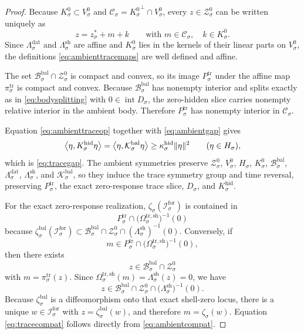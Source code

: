 \documentclass[11pt]{article}
\newcommand{\ForSpace}[1]{\mathcal I_{#1}^{\mathrm{for}}}
\newcommand{\BalBody}[1]{\mathcal B_{#1}^{\mathrm{bal}}}
\newcommand{\BalData}[1]{\Lambda_{#1}^{\mathrm{dat}}}
\newcommand{\BalShell}[1]{\Lambda_{#1}^{\mathrm{sh}}}
\newcommand{\ZeroHiddenSlice}[1]{\mathcal Z_{#1}^{0}}
\newcommand{\ZeroHiddenVec}[1]{V_{#1}^{0}}
\newcommand{\Kernel}[1]{K_{#1}^{0}}
\newcommand{\BalOp}[1]{\mathcal K_{#1}^{\mathrm{bal}}}
\newcommand{\BalEmbed}[1]{\zeta_{#1}^{\mathrm{bal}}}
\newcommand{\ReferencePoint}[1]{z_{#1}^{\ast}}
\newcommand{\GapSpace}[1]{H_{#1}}
\newcommand{\GapBody}[1]{D_{#1}}
\newcommand{\HiddenOperator}[1]{K_{#1}^{\mathrm{hid}}}
\newcommand{\CoreState}[1]{\mathcal C_{#1}}
\newcommand{\TraceBody}[1]{P_{#1}^{\mathrm{tr}}}
\newcommand{\TraceCoord}[1]{\pi_{#1}^{\mathrm{tr}}}
\newcommand{\TraceShellMap}[1]{\Omega_{#1}^{\mathrm{tr,sh}}}
\newcommand{\TraceEmbed}[1]{\zeta_{#1}}
\begin{document}
\begin{proof}
Because \(\Kernel{\sigma}\subset\ZeroHiddenVec{\sigma}\) and \(\CoreState{\sigma}={\Kernel{\sigma}}^{\perp}\cap\ZeroHiddenVec{\sigma}\), every \(z\in\ZeroHiddenSlice{\sigma}\) can be written uniquely as
\[
z=\ReferencePoint{\sigma}+m+k
\qquad
\text{with }
m\in\CoreState{\sigma},
\quad
k\in\Kernel{\sigma}.
\]
Since \(\BalData{\sigma}\) and \(\BalShell{\sigma}\) are affine and \(\Kernel{\sigma}\) lies in the kernels of their linear parts on \(\ZeroHiddenVec{\sigma}\), the definitions \eqref{eq:ambienttracemaps} are well defined and affine.

The set \(\BalBody{\sigma}\cap\ZeroHiddenSlice{\sigma}\) is compact and convex, so its image \(\TraceBody{\sigma}\) under the affine map \(\TraceCoord{\sigma}\) is compact and convex. Because \(\BalBody{\sigma}\) has nonempty interior and splits exactly as in \eqref{eq:bodysplitting} with \(0\in\operatorname{int}\GapBody{\sigma}\), the zero-hidden slice carries nonempty relative interior in the ambient body. Therefore \(\TraceBody{\sigma}\) has nonempty interior in \(\CoreState{\sigma}\).

Equation \eqref{eq:ambienttraceop} together with \eqref{eq:ambientgap} gives
\[
\ev{\eta,\HiddenOperator{\sigma}\eta}
=
\ev{\eta,\BalOp{\sigma}\eta}
\ge
\kappa_{\sigma}^{\mathrm{hid}}\|\eta\|^{2}
\qquad
(\eta\in\GapSpace{\sigma}),
\]
which is \eqref{eq:tracegap}. The ambient symmetries preserve \(\ZeroHiddenSlice{\sigma}\), \(\ZeroHiddenVec{\sigma}\), \(\GapSpace{\sigma}\), \(\Kernel{\sigma}\), \(\BalBody{\sigma}\), \(\BalData{\sigma}\), \(\BalShell{\sigma}\), and \(\BalOp{\sigma}\), so they induce the trace symmetry group and time reversal, preserving \(\TraceBody{\sigma}\), the exact zero-response trace slice, \(\GapBody{\sigma}\), and \(\HiddenOperator{\sigma}\).

For the exact zero-response realization, \(\TraceEmbed{\sigma}(\ForSpace{\sigma})\) is contained in
\[
\TraceBody{\sigma}\cap
\bigl(\TraceShellMap{\sigma}\bigr)^{-1}(0)
\]
because \(\BalEmbed{\sigma}(\ForSpace{\sigma})\subset
\BalBody{\sigma}\cap\ZeroHiddenSlice{\sigma}\cap(\BalShell{\sigma})^{-1}(0)\). Conversely, if
\[
m\in\TraceBody{\sigma}\cap
\bigl(\TraceShellMap{\sigma}\bigr)^{-1}(0),
\]
then there exists
\[
z\in\BalBody{\sigma}\cap\ZeroHiddenSlice{\sigma}
\]
with \(m=\TraceCoord{\sigma}(z)\). Since \(\TraceShellMap{\sigma}(m)=\BalShell{\sigma}(z)=0\), we have
\[
z\in
\BalBody{\sigma}\cap
\ZeroHiddenSlice{\sigma}\cap
\bigl(\BalShell{\sigma}\bigr)^{-1}(0).
\]
Because \(\BalEmbed{\sigma}\) is a diffeomorphism onto that exact shell-zero locus, there is a unique \(w\in\ForSpace{\sigma}\) with \(z=\BalEmbed{\sigma}(w)\), and therefore \(m=\TraceEmbed{\sigma}(w)\). Equation \eqref{eq:tracecompat} follows directly from \eqref{eq:ambientcompat}.


\end{proof}
\end{document}
